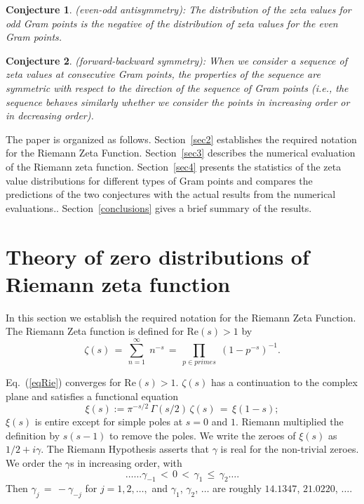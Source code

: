 \documentclass[twoside]{article}
\newtheorem{mydef}{Conjecture}
\begin{document}
\begin{mydef}\label{antisymmetry}
(even-odd antisymmetry): The distribution of the zeta values for odd Gram points is the negative of the distribution of zeta values for the even Gram points.
\end{mydef}
\begin{mydef}\label{symmetry}
(forward-backward symmetry): When we consider a sequence of zeta values at consecutive Gram points, the properties of the sequence are symmetric with respect to the direction of the sequence of Gram points (i.e., the sequence behaves similarly whether we consider the points in increasing order or in decreasing order).
\end{mydef}

The paper is organized as follows.
Section~\ref{sec2} establishes the required notation for the 
Riemann Zeta Function. 
Section~\ref{sec3} describes the numerical evaluation of the Riemann zeta function. 
Section~\ref{sec4} presents the statistics of the zeta value distributions for different types of Gram points and compares the predictions of the two conjectures with the actual results from the numerical evaluations.. 
Section~\ref{conclusions}
gives a brief summary of the results. 


\section{\label{sec2}Theory of zero distributions of Riemann zeta function }

In this section we  establish the required notation for the 
Riemann Zeta Function. 
The Riemann Zeta function is defined for $\mathrm{Re} (s) > 1$ by
\begin{equation}
\zeta ( s ) \, = \, \sum^{\infty}_{n = 1} \; n^{-s} \, = \, \prod_{p \in primes} \;
\left( 1 - p^{-s} \right)^{-1}.
\label{eqRie}
\end{equation}

Eq.~(\ref{eqRie})  converges for $\mathrm{Re} (s) > 1$.  
 $\zeta ( s )$ has a  continuation
to the complex plane and satisfies a functional equation \cite{Riemann(1858),Riemann(1892),Titchmarsh(1986),Edwards(1974)}
\begin{equation}  
\xi(s):= \pi^{-s/2} \, \Gamma (s/2) \, \zeta ( s ) \, = \, \xi ( 1 - s );
\label{eq:func}
\end{equation}
$\xi(s)$ is entire except for simple poles at $s = 0$ and $1$. Riemann
multiplied the definition by $s(s-1)$ to remove the poles. We
write the zeroes of $\xi(s)$ as $1/2 + i \gamma$. The Riemann Hypothesis  
asserts that $\gamma$ is real for the non-trivial zeroes.
We order the $\gamma$s in increasing order, with 
\begin{equation}
\ldots \ldots \gamma_{-1} \, < \, 0 \, < \, 
\gamma_1 \, \leq \, \gamma_2 \ldots. 
\end{equation}
Then $\gamma_j \, = \, - \gamma_{-j}$ for $j = 1, 2, \ldots,$ 
and    $\gamma_1$, $\gamma_2$, $\ldots$  are roughly
$14.1347$, $21.0220$, $\ldots$.
\end{document}
